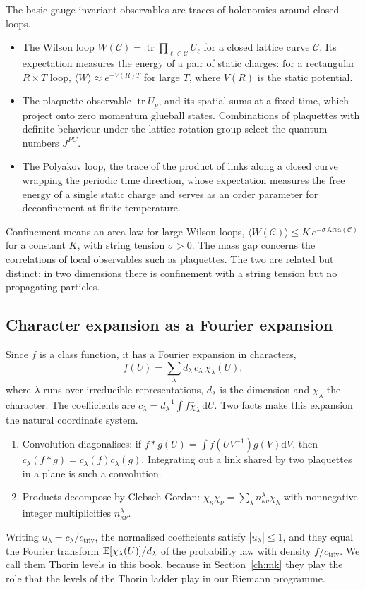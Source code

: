 The basic gauge invariant observables are traces of holonomies around closed loops.
\begin{itemize}
\item The Wilson loop $W(\mathcal C)=\operatorname{tr}\prod_{\ell\in\mathcal C}U_\ell$ for a closed lattice curve $\mathcal C$. Its expectation measures the energy of a pair of static charges: for a rectangular $R\times T$ loop, $\langle W\rangle\approx e^{-V(R)T}$ for large $T$, where $V(R)$ is the static potential.
\item The plaquette observable $\operatorname{tr}U_p$, and its spatial sums at a fixed time, which project onto zero momentum glueball states. Combinations of plaquettes with definite behaviour under the lattice rotation group select the quantum numbers $J^{PC}$.
\item The Polyakov loop, the trace of the product of links along a closed curve wrapping the periodic time direction, whose expectation measures the free energy of a single static charge and serves as an order parameter for deconfinement at finite temperature.
\end{itemize}
Confinement means an area law for large Wilson loops, $\langle W(\mathcal C)\rangle\le K\,e^{-\sigma\,\mathrm{Area}(\mathcal C)}$ for a constant $K$, with string tension $\sigma>0$. The mass gap concerns the correlations of local observables such as plaquettes. The two are related but distinct: in two dimensions there is confinement with a string tension but no propagating particles.

\subsection{Character expansion as a Fourier expansion}

Since $f$ is a class function, it has a Fourier expansion in characters,
\[
f(U)=\sum_\lambda d_\lambda\,c_\lambda\,\chi_\lambda(U),
\]
where $\lambda$ runs over irreducible representations, $d_\lambda$ is the dimension and $\chi_\lambda$ the character. The coefficients are $c_\lambda=d_\lambda^{-1}\int f\bar\chi_\lambda\,\mathrm dU$. Two facts make this expansion the natural coordinate system.
\begin{enumerate}
\item[(i)] Convolution diagonalises: if $f*g(U)=\int f(UV^{-1})g(V)\mathrm dV$, then $c_\lambda(f*g)=c_\lambda(f)c_\lambda(g)$. Integrating out a link shared by two plaquettes in a plane is such a convolution.
\item[(ii)] Products decompose by Clebsch Gordan: $\chi_\kappa\chi_\nu=\sum_\lambda n^\lambda_{\kappa\nu}\chi_\lambda$ with nonnegative integer multiplicities $n^\lambda_{\kappa\nu}$.
\end{enumerate}
Writing $u_\lambda=c_\lambda/c_{\mathrm{triv}}$, the normalised coefficients satisfy $|u_\lambda|\le1$, and they equal the Fourier transform $\mathbb{E}[\chi_\lambda(U)]/d_\lambda$ of the probability law with density $f/c_{\mathrm{triv}}$. We call them Thorin levels in this book, because in Section~\ref{ch:mk} they play the role that the levels of the Thorin ladder play in our Riemann programme.

